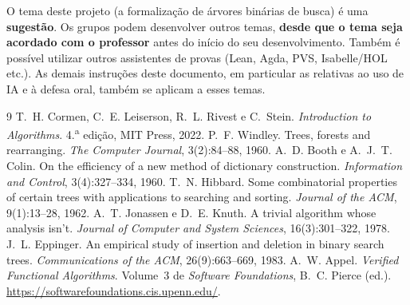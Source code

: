 \documentclass[11pt,a4paper]{article}
\begin{document}
O tema deste projeto (a formalização de árvores binárias de busca) é uma
\textbf{sugestão}. Os grupos podem desenvolver outros temas, \textbf{desde
  que o tema seja acordado com o professor} antes do início do seu
desenvolvimento. Também é possível utilizar outros assistentes de provas
(Lean, Agda, PVS, Isabelle/HOL etc.). As demais instruções
deste documento, em particular as relativas ao uso de IA e à defesa oral,
também se aplicam a esses temas.

{\small
\begin{thebibliography}{9}
\setlength{\itemsep}{1pt}
 T.~H. Cormen, C.~E. Leiserson, R.~L. Rivest e C.~Stein.
  \emph{Introduction to Algorithms}. 4.\textsuperscript{a} edição, MIT Press,
  2022.
 P.~F. Windley. Trees, forests and rearranging.
  \emph{The Computer Journal}, 3(2):84--88, 1960.
 A.~D. Booth e A.~J.~T. Colin. On the efficiency of a
  new method of dictionary construction. \emph{Information and Control},
  3(4):327--334, 1960.
 T.~N. Hibbard. Some combinatorial properties of
  certain trees with applications to searching and sorting. \emph{Journal
    of the ACM}, 9(1):13--28, 1962.
 A.~T. Jonassen e D.~E. Knuth. A trivial algorithm
  whose analysis isn't. \emph{Journal of Computer and System Sciences},
  16(3):301--322, 1978.
 J.~L. Eppinger. An empirical study of insertion and
  deletion in binary search trees. \emph{Communications of the ACM},
  26(9):663--669, 1983.
 A.~W. Appel. \emph{Verified Functional Algorithms}.
  Volume~3 de \emph{Software Foundations}, B.~C. Pierce (ed.).
  \url{https://softwarefoundations.cis.upenn.edu/}.
\end{thebibliography}
}
\end{document}
